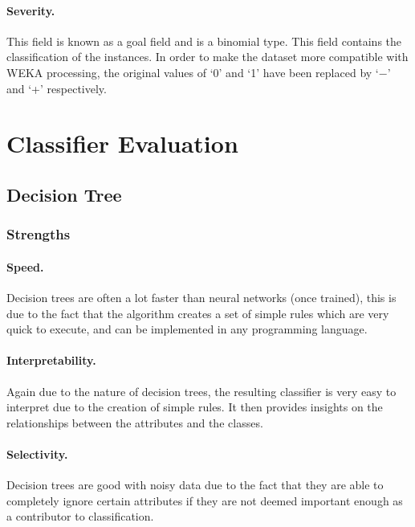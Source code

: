\documentclass[12pt]{article}
\begin{document}
    \paragraph{Severity.}
      This field is known as a goal field and is a binomial type. This field contains the classification of the instances. In order to make the dataset more compatible with WEKA processing, the original values of ‘0’ and ‘1’ have been replaced by ‘$-$’ and ‘+’ respectively.

\section{Classifier Evaluation}
  \subsection{Decision Tree}

    \subsubsection{Strengths}
      \paragraph{Speed.}
        Decision trees are often a lot faster than neural networks (once trained), this is due to the fact that the algorithm creates a set of simple rules which are very quick to execute, and can be implemented in any programming language.
      \paragraph{Interpretability.}
        Again due to the nature of decision trees, the resulting classifier is very easy to interpret due to the creation of simple rules. It then provides insights on the relationships between the attributes and the classes.
      \paragraph{Selectivity.}
        Decision trees are good with noisy data due to the fact that they are able to completely ignore certain attributes if they are not deemed important enough as a contributor to classification.
\end{document}
